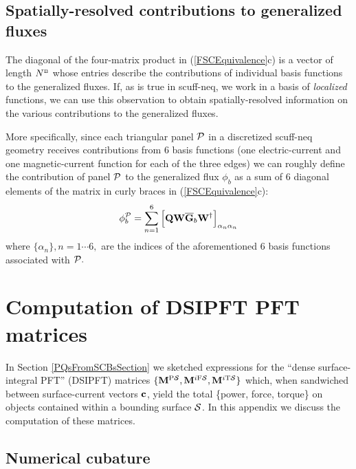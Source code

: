 \documentclass[letterpaper]{article}
\newcommand{\PS}{^{\text{\scriptsize P}\mc S}}
\newcommand{\IFS}{^{i\text{\scriptsize F}\mc S}}
\newcommand{\ITS}{^{i\text{\scriptsize T}\mc S}}
\begin{document}
\subsection*{Spatially-resolved contributions to generalized fluxes}

The diagonal of the four-matrix product in (\ref{FSCEquivalence}c) 
is a vector of length $N^{\hbox{\tiny{B}}}$ whose entries describe the 
contributions of individual basis functions to the generalized
fluxes. If, as is true in {\sc scuff-neq}, we work in a basis
of \textit{localized} functions, we can use this observation 
to obtain spatially-resolved information on the various 
contributions to the generalized fluxes.

More specifically, since each triangular panel $\mathcal{P}$ 
in a discretized {\sc scuff-neq} geometry receives contributions 
from 6 basis functions (one electric-current and one magnetic-current
function for each of the three edges) we can roughly define the
contribution of panel $\mathcal{P}$ to the generalized flux $\phi_b$ 
as a sum of 6 diagonal elements of the matrix in curly braces
in (\ref{FSCEquivalence}c):
$$ \phi_{b}^{\mathcal{P}} 
   = 
   \sum_{n=1}^6
   \Big[\mathbf{Q} \mathbf{W} \overline{\mathbf{G}}_b \mathbf{W}^\dagger\Big]_{\alpha_n \alpha_n}
$$
where $\{\alpha_n\}, n=1\cdots 6,$ are the indices of the
aforementioned 6 basis functions associated with $\mathcal{P}.$

\appendix

\section{Computation of DSIPFT PFT matrices}

In Section \ref{PQsFromSCBsSection} we sketched expressions for
the ``dense surface-integral PFT'' (DSIPFT)
matrices $\{\vb M\PS, \vb M\IFS, \vb M\ITS\}$ which, when sandwiched
between surface-current vectors $\mathbf{c}$, yield the total
\{power, force, torque\} on objects contained within a bounding
surface $\mathcal{S}$. In this appendix we discuss the computation of 
these matrices.

\subsection{Numerical cubature}
\end{document}
